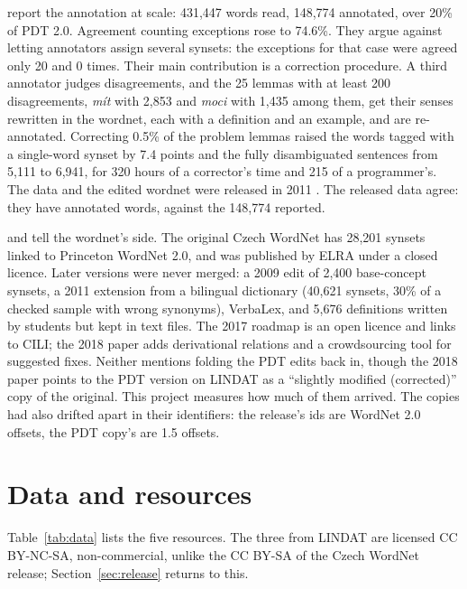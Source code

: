 \documentclass[a4paper,12pt]{article}
\begin{document}
\citet{bejcek-etal2006} report the annotation at scale: 431,447 words read,
148,774 annotated, over 20\% of PDT 2.0.  Agreement counting exceptions
rose to 74.6\%.  They argue against letting annotators assign several
synsets: the exceptions for that case were agreed only 20 and 0 times.
Their main contribution is a correction procedure.  A third annotator
judges disagreements, and the 25 lemmas with at least 200 disagreements,
\textit{mít} with 2,853 and \textit{moci} with 1,435 among them, get
their senses rewritten in the wordnet, each with a definition and an
example, and are re-annotated.  Correcting 0.5\% of the problem lemmas
raised the words tagged with a single-word synset by 7.4 points and the
fully disambiguated sentences from 5,111 to 6,941, for 320 hours of a
corrector's time and 215 of a programmer's.  The data and the edited
wordnet were released in 2011 \citep{pdt-wsd2011,cwn19pdt2011}.  The released data agree: they have  annotated words,
against the 148,774 reported.

\citet{rambousek-etal2017} and \citet{rambousek-etal2018} tell the
wordnet's side.  The original Czech WordNet \citep{palasmrz2004} has
28,201 synsets linked to Princeton WordNet 2.0, and was published by ELRA
under a closed licence.  Later versions were never merged: a 2009 edit of
2,400 base-concept synsets, a 2011 extension from a bilingual dictionary
(40,621 synsets, 30\% of a checked sample with wrong synonyms), VerbaLex,
and 5,676 definitions written by students but kept in text files.  The
2017 roadmap is an open licence and links to CILI; the 2018 paper adds
derivational relations and a crowdsourcing tool for suggested fixes.
Neither mentions folding the PDT edits back in, though the 2018 paper
points to the PDT version on LINDAT as a ``slightly modified (corrected)''
copy of the original.  This project measures how much of them arrived.  The copies
had also drifted apart in their identifiers: the release's ids are
WordNet 2.0 offsets, the PDT copy's are 1.5 offsets.

\section{Data and resources}
\label{sec:data}

Table~\ref{tab:data} lists the five resources.  The three from LINDAT are
licensed CC BY-NC-SA, non-commercial, unlike the CC BY-SA of the Czech
WordNet release; Section~\ref{sec:release} returns to this.
\end{document}
